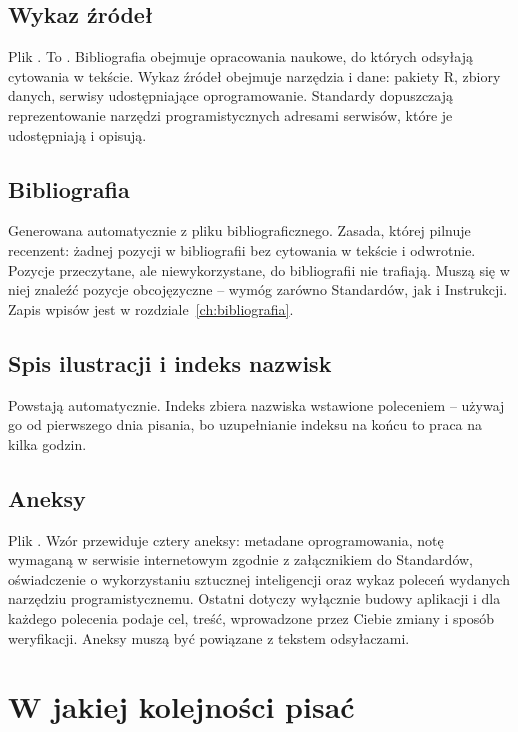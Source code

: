 \subsection{Wykaz źródeł}\label{sec:wykazzrodel}

Plik . To . Bibliografia obejmuje opracowania naukowe, do których odsyłają cytowania w tekście. Wykaz źródeł obejmuje narzędzia i dane: pakiety R, zbiory danych, serwisy udostępniające oprogramowanie. Standardy dopuszczają reprezentowanie narzędzi programistycznych adresami serwisów, które je udostępniają i opisują.

\subsection{Bibliografia}

Generowana automatycznie z pliku bibliograficznego. Zasada, której pilnuje recenzent: żadnej pozycji w bibliografii bez cytowania w tekście i odwrotnie. Pozycje przeczytane, ale niewykorzystane, do bibliografii nie trafiają. Muszą się w niej znaleźć pozycje obcojęzyczne -- wymóg zarówno Standardów, jak i Instrukcji. Zapis wpisów jest w rozdziale~\ref{ch:bibliografia}.

\subsection{Spis ilustracji i indeks nazwisk}

Powstają automatycznie. Indeks zbiera nazwiska wstawione poleceniem  -- używaj go od pierwszego dnia pisania, bo uzupełnianie indeksu na końcu to praca na kilka godzin.

\subsection{Aneksy}

Plik . Wzór przewiduje cztery aneksy: metadane oprogramowania, notę wymaganą w serwisie internetowym zgodnie z załącznikiem do Standardów, oświadczenie o wykorzystaniu sztucznej inteligencji oraz wykaz poleceń wydanych narzędziu programistycznemu. Ostatni dotyczy wyłącznie budowy aplikacji i dla każdego polecenia podaje cel, treść, wprowadzone przez Ciebie zmiany i sposób weryfikacji. Aneksy muszą być powiązane z tekstem odsyłaczami.

\section{W jakiej kolejności pisać}\label{sec:kolejnosc}

